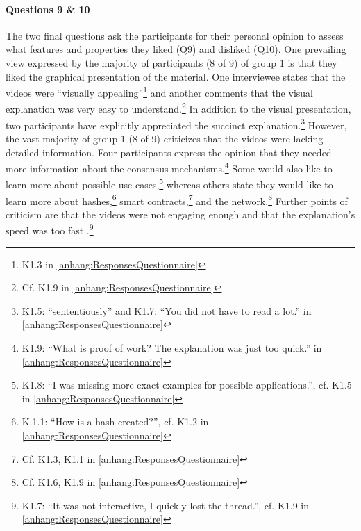 \paragraph{Questions 9 \& 10}The two final questions ask the participants for their personal opinion to assess what features and properties they liked (Q9) and disliked (Q10). One prevailing view expressed by the majority of participants (8 of 9) of group 1 is that they liked the graphical presentation of the material. One interviewee states that the videos were \enquote{visually appealing}\footnote{K1.3 in \ref{anhang:ResponsesQuestionnaire}} and another comments that the visual explanation was very easy to understand.\footnote{Cf. K1.9 in \ref{anhang:ResponsesQuestionnaire}} In addition to the visual presentation, two participants have explicitly appreciated the succinct explanation.\footnote{K1.5: \enquote{sententiously} and K1.7: \enquote{You did not have to read a lot.} in \ref{anhang:ResponsesQuestionnaire}} However, the vast majority of group 1 (8 of 9) criticizes that the videos were lacking detailed information. Four participants express the opinion that they needed more information about the consensus mechanisms.\footnote{K1.9: \enquote{What is proof of work? The explanation was just too quick.} in \ref{anhang:ResponsesQuestionnaire}} Some would also like to learn more about possible use cases,\footnote{K1.8: \enquote{I was missing more exact examples for possible applications.}, cf. K1.5 in \ref{anhang:ResponsesQuestionnaire}} whereas others state they would like to learn more about hashes,\footnote{K.1.1: \enquote{How is a hash created?}, cf. K1.2 in \ref{anhang:ResponsesQuestionnaire}} smart contracts,\footnote{Cf. K1.3, K1.1 in \ref{anhang:ResponsesQuestionnaire}} and the network.\footnote{Cf. K1.6, K1.9 in \ref{anhang:ResponsesQuestionnaire}}
Further points of criticism are that the videos were not engaging enough and that the explanation's speed was too fast .\footnote{K1.7: \enquote{It was not interactive, I quickly lost the thread.}, cf. K1.9 in \ref{anhang:ResponsesQuestionnaire}}

